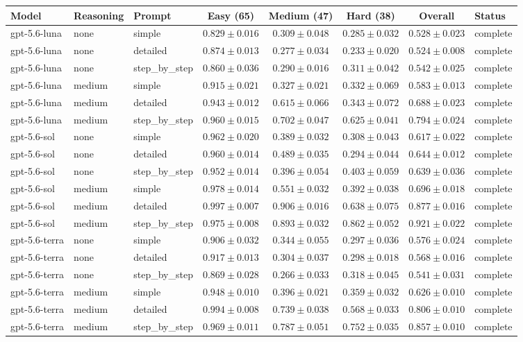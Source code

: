 \begin{tabular}{lllcccc l}
\hline
Model & Reasoning & Prompt & Easy (65) & Medium (47) & Hard (38) & Overall & Status \\
\hline
gpt-5.6-luna & none & simple & $0.829\pm0.016$ & $0.309\pm0.048$ & $0.285\pm0.032$ & $0.528\pm0.023$ & complete \\
gpt-5.6-luna & none & detailed & $0.874\pm0.013$ & $0.277\pm0.034$ & $0.233\pm0.020$ & $0.524\pm0.008$ & complete \\
gpt-5.6-luna & none & step\_by\_step & $0.860\pm0.036$ & $0.290\pm0.016$ & $0.311\pm0.042$ & $0.542\pm0.025$ & complete \\
gpt-5.6-luna & medium & simple & $0.915\pm0.021$ & $0.327\pm0.021$ & $0.332\pm0.069$ & $0.583\pm0.013$ & complete \\
gpt-5.6-luna & medium & detailed & $0.943\pm0.012$ & $0.615\pm0.066$ & $0.343\pm0.072$ & $0.688\pm0.023$ & complete \\
gpt-5.6-luna & medium & step\_by\_step & $0.960\pm0.015$ & $0.702\pm0.047$ & $0.625\pm0.041$ & $0.794\pm0.024$ & complete \\
gpt-5.6-sol & none & simple & $0.962\pm0.020$ & $0.389\pm0.032$ & $0.308\pm0.043$ & $0.617\pm0.022$ & complete \\
gpt-5.6-sol & none & detailed & $0.960\pm0.014$ & $0.489\pm0.035$ & $0.294\pm0.044$ & $0.644\pm0.012$ & complete \\
gpt-5.6-sol & none & step\_by\_step & $0.952\pm0.014$ & $0.396\pm0.054$ & $0.403\pm0.059$ & $0.639\pm0.036$ & complete \\
gpt-5.6-sol & medium & simple & $0.978\pm0.014$ & $0.551\pm0.032$ & $0.392\pm0.038$ & $0.696\pm0.018$ & complete \\
gpt-5.6-sol & medium & detailed & $0.997\pm0.007$ & $0.906\pm0.016$ & $0.638\pm0.075$ & $0.877\pm0.016$ & complete \\
gpt-5.6-sol & medium & step\_by\_step & $0.975\pm0.008$ & $0.893\pm0.032$ & $0.862\pm0.052$ & $0.921\pm0.022$ & complete \\
gpt-5.6-terra & none & simple & $0.906\pm0.032$ & $0.344\pm0.055$ & $0.297\pm0.036$ & $0.576\pm0.024$ & complete \\
gpt-5.6-terra & none & detailed & $0.917\pm0.013$ & $0.304\pm0.037$ & $0.298\pm0.018$ & $0.568\pm0.016$ & complete \\
gpt-5.6-terra & none & step\_by\_step & $0.869\pm0.028$ & $0.266\pm0.033$ & $0.318\pm0.045$ & $0.541\pm0.031$ & complete \\
gpt-5.6-terra & medium & simple & $0.948\pm0.010$ & $0.396\pm0.021$ & $0.359\pm0.032$ & $0.626\pm0.010$ & complete \\
gpt-5.6-terra & medium & detailed & $0.994\pm0.008$ & $0.739\pm0.038$ & $0.568\pm0.033$ & $0.806\pm0.010$ & complete \\
gpt-5.6-terra & medium & step\_by\_step & $0.969\pm0.011$ & $0.787\pm0.051$ & $0.752\pm0.035$ & $0.857\pm0.010$ & complete \\
\hline
\end{tabular}
